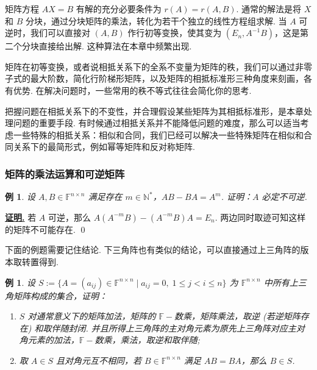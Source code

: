 \documentclass[10pt,openany]{article}
\theoremstyle{thmstyle} %
\theoremstyle{defstyle} %
\theoremstyle{prostyle} %
\theoremstyle{exastyle}
\newtheorem{example}[theorem]{例}
\theoremstyle{remstyle}
\renewenvironment{proof}[1][证明]{\par\underline{\textbf{#1.}} \;\fangsong}{\qed\par}
\newcommand{\F}{\mathbb{F}}
\newcommand{\n}{^{n \times n}}
\begin{document}
矩阵方程 \( AX=B \) 有解的充分必要条件为 \( r(A)=r(A,B) \). 通常的解法是将 \( X \) 和 \( B \) 分块，通过分块矩阵的乘法，转化为若干个独立的线性方程组求解. 当 \( A \) 可逆时，我们可以直接对 \( (A,B) \) 作行初等变换，使其变为 \( (E_n,A^{-1}B) \)，这是第二个分块直接给出解. 这种算法在本章中频繁出现.

矩阵在初等变换，或者说相抵关系下的全系不变量为矩阵的秩，我们可以通过非零子式的最大阶数，简化行阶梯形矩阵，以及矩阵的相抵标准形三种角度来刻画，各有优势. 在解决问题时，一些常用的秩不等式往往会简化你的思考.

把握问题在相抵关系下的不变性，并合理假设某些矩阵为其相抵标准形，是本章处理问题的重要手段. 有时候通过相抵关系并不能降低问题的难度，那么可以适当考虑一些特殊的相抵关系：相似和合同，我们已经可以解决一些特殊矩阵在相似和合同关系下的最简形式，例如幂等矩阵和反对称矩阵.

\subsubsection{矩阵的乘法运算和可逆矩阵}

\begin{example}
	设 \( A,B \in \F\n \) 满足存在 \( m \in \mathbb{N}^* \)，\( AB-BA=A^m \). 证明：\( A \) 必定不可逆.
\end{example}

\begin{proof}
	若 \( A \) 可逆，那么 \( A(A^{-m}B)-(A^{-m}B)A=E_n \). 两边同时取迹可知这样的矩阵不可能存在.
\end{proof}


下面的例题需要记住结论. 下三角阵也有类似的结论，可以直接通过上三角阵的版本取转置得到.

\begin{example} \label{4.2.2}
	设 \( S:=\{ A=(a_{ij}) \in \F\n \mid a_{ij}=0, \; 1 \leq j<i \leq n\} \) 为 \( \F\n \) 中所有上三角矩阵构成的集合，证明：
	\begin{enumerate}[(1)]
		\item \( S \) 对通常意义下的矩阵加法，矩阵的 \( \F-\)数乘，矩阵乘法，取逆 (若逆矩阵存在) 和取伴随封闭. 并且所得上三角阵的主对角元素为原先上三角阵对应主对角元素的加法，\( \F-\)数乘，乘法，取逆和取伴随;
		\item 取 \( A \in S \) 且对角元互不相同，若 \( B \in \F\n \) 满足 \( AB=BA \)，那么 \( B \in S \).
	\end{enumerate}
\end{example}
\end{document}

